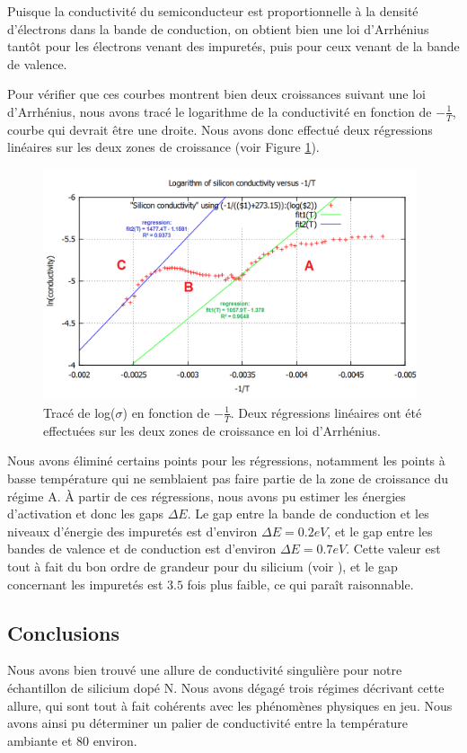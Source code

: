 Puisque la conductivité du semiconducteur est proportionnelle à la densité d'électrons dans la bande de conduction, on obtient bien une loi d'Arrhénius tantôt pour les électrons venant des impuretés, puis pour ceux venant de la bande de valence.

Pour vérifier que ces courbes montrent bien deux croissances suivant une loi d'Arrhénius, nous avons tracé le logarithme de la conductivité en fonction de $-\frac{1}{T}$, courbe qui devrait être une droite. Nous avons donc effectué deux régressions linéaires sur les deux zones de croissance (voir Figure \ref{log}).

\begin{figure}[!b]
  \begin{center}
		\includegraphics[width=11cm]{./images/Fit_de_log(sigma)_versus_-inverse(T).png}
		\caption{Tracé de log($\sigma$) en fonction de $-\frac{1}{T}$. Deux régressions linéaires ont été effectuées sur les deux zones de croissance en loi d'Arrhénius.}
		\label{log}
	\end{center}
\end{figure}

Nous avons éliminé certains points pour les régressions, notamment les points à basse température qui ne semblaient pas faire partie de la zone de croissance du régime A. À partir de ces régressions, nous avons pu estimer les énergies d'activation et donc les gaps $\Delta E$. Le gap entre la bande de conduction et les niveaux d'énergie des impuretés est d'environ $\Delta E = 0.2 eV$, et le gap entre les bandes de valence et de conduction est d'environ $\Delta E = 0.7 eV$. Cette valeur est tout à fait du bon ordre de grandeur pour du silicium (voir \cite{kittel_introduction_1976}), et le gap concernant les impuretés est $3.5$ fois plus faible, ce qui paraît raisonnable.

\subsection{Conclusions}
Nous avons bien trouvé une allure de conductivité singulière pour notre échantillon de silicium dopé N. Nous avons dégagé trois régimes décrivant cette allure, qui sont tout à fait cohérents avec les phénomènes physiques en jeu. Nous avons ainsi pu déterminer un palier de conductivité entre la température ambiante et 80 \celsius{} environ.
